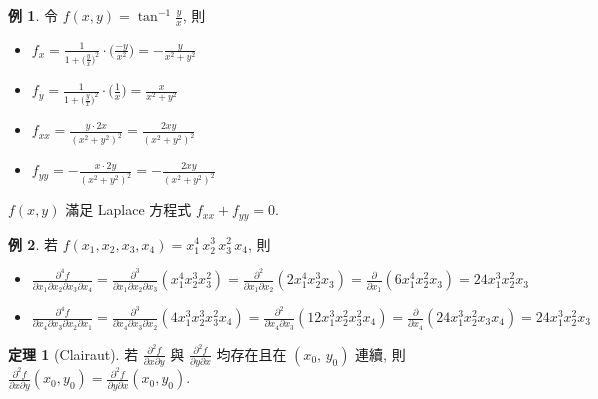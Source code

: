 \documentclass[12pt]{extarticle}
\newcommand{\ds}{\displaystyle}
\theoremstyle{definition}
\newtheorem*{thm}{定理}
\newtheorem*{ex}{例}
\newcommand{\pdiff}[2]{\frac{\partial #1}{\partial #2}}
\begin{document}
\begin{ex}
  令 $\ds f(x,y) = \tan^{-1}\frac{y}{x}$, 則
  \begin{multicols}{2}
    \begin{itemize}\setlength{\itemsep}{0pt}
      \item $\ds f_x = \frac{1}{1 + \big(\frac{y}{x}\big)^2}\cdot\bigg(\frac{-y}{x^2}\bigg) = -\frac{y}{x^2 + y^2}$ 
      \item $\ds f_y = \frac{1}{1 + \big(\frac{y}{x}\big)^2}\cdot\bigg(\frac{1}{x}\bigg) = \frac{x}{x^2 + y^2}$ 
      \item $\ds f_{xx} = \frac{y\cdot 2x}{(x^2 + y^2)^2} = \frac{2 x y}{(x^2 + y^2)^2}$
      \item $\ds f_{yy} = -\frac{x\cdot 2y}{(x^2 + y^2)^2} = -\frac{2 x y}{(x^2 + y^2)^2}$
    \end{itemize}
  \end{multicols}
  $\ds f(x, y)$ 滿足 Laplace 方程式 $\ds f_{xx} + f_{yy} = 0$. 
\end{ex}

\begin{ex}
  若 $\ds f(x_1,x_2,x_3,x_4) = x_1^4\, x_2^3\, x_3^2\, x_4$, 則
  \begin{itemize}\setlength{\itemsep}{0pt}
    \item $\ds\frac{\partial^4 f}{\partial x_1\partial x_2\partial x_3\partial x_4} = \frac{\partial^3}{\partial x_1\partial x_2\partial x_3}\left(x_1^4 x_2^3 x_3^2\right) = \frac{\partial^2}{\partial x_1\partial x_2}\left(2 x_1^4 x_2^3 x_3\right) = \pdiff{}{x_1}\left(6 x_1^4 x_2^2 x_3\right) = 24 x_1^3 x_2^2 x_3$ 
    \item $\ds\frac{\partial^4 f}{\partial x_4\partial x_3\partial x_2\partial x_1} = \frac{\partial^3}{\partial x_4\partial x_3\partial x_2}\left(4 x_1^3 x_2^3 x_3^2 x_4\right) = \frac{\partial^2}{\partial x_4\partial x_3}\left(12 x_1^3 x_2^2 x_3^2 x_4\right) = \pdiff{}{x_4}\left(24 x_1^3 x_2^2 x_3 x_4\right) =  24 x_1^3 x_2^2 x_3$
  \end{itemize}
\end{ex}

\begin{thm}[Clairaut]
  若 $\ds\frac{\partial^2 f}{\partial x\partial y}$ 與 $\ds\frac{\partial^2 f}{\partial y\partial x}$ 均存在且在 $(x_0,\,y_0)$ 連續, 則 $\ds\frac{\partial^2 f}{\partial x\partial y}(x_0, y_0) = \frac{\partial^2 f}{\partial y\partial x}(x_0, y_0)$. 
\end{thm}
\end{document}
